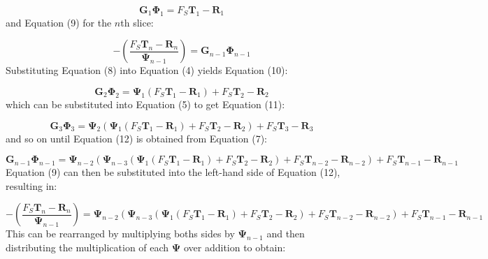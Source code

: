 \documentclass[12pt]{article}
\begin{document}
\begin{displaymath}
{\mathbf{G}}_{1} {\mathbf{Φ}}_{1}={F_{S}} {\mathbf{T}}_{1}-{\mathbf{R}}_{1}
\end{displaymath}
and Equation (9) for the $n$th slice:

\begin{displaymath}
-\left(\frac{{F_{S}} {\mathbf{T}}_{n}-{\mathbf{R}}_{n}}{{\mathbf{Ψ}}_{n-1}}\right)={\mathbf{G}}_{n-1} {\mathbf{Φ}}_{n-1}
\end{displaymath}
Substituting Equation (8) into Equation (4) yields Equation (10):

\begin{displaymath}
{\mathbf{G}}_{2} {\mathbf{Φ}}_{2}={\mathbf{Ψ}}_{1} \left({F_{S}} {\mathbf{T}}_{1}-{\mathbf{R}}_{1}\right)+{F_{S}} {\mathbf{T}}_{2}-{\mathbf{R}}_{2}
\end{displaymath}
which can be substituted into Equation (5) to get Equation (11):

\begin{displaymath}
{\mathbf{G}}_{3} {\mathbf{Φ}}_{3}={\mathbf{Ψ}}_{2} \left({\mathbf{Ψ}}_{1} \left({F_{S}} {\mathbf{T}}_{1}-{\mathbf{R}}_{1}\right)+{F_{S}} {\mathbf{T}}_{2}-{\mathbf{R}}_{2}\right)+{F_{S}} {\mathbf{T}}_{3}-{\mathbf{R}}_{3}
\end{displaymath}
and so on until Equation (12) is obtained from Equation (7):

\begin{displaymath}
{\mathbf{G}}_{n-1} {\mathbf{Φ}}_{n-1}={\mathbf{Ψ}}_{n-2} \left({\mathbf{Ψ}}_{n-3} \left({\mathbf{Ψ}}_{1} \left({F_{S}} {\mathbf{T}}_{1}-{\mathbf{R}}_{1}\right)+{F_{S}} {\mathbf{T}}_{2}-{\mathbf{R}}_{2}\right)+{F_{S}} {\mathbf{T}}_{n-2}-{\mathbf{R}}_{n-2}\right)+{F_{S}} {\mathbf{T}}_{n-1}-{\mathbf{R}}_{n-1}
\end{displaymath}
Equation (9) can then be substituted into the left-hand side of Equation (12), resulting in:

\begin{displaymath}
-\left(\frac{{F_{S}} {\mathbf{T}}_{n}-{\mathbf{R}}_{n}}{{\mathbf{Ψ}}_{n-1}}\right)={\mathbf{Ψ}}_{n-2} \left({\mathbf{Ψ}}_{n-3} \left({\mathbf{Ψ}}_{1} \left({F_{S}} {\mathbf{T}}_{1}-{\mathbf{R}}_{1}\right)+{F_{S}} {\mathbf{T}}_{2}-{\mathbf{R}}_{2}\right)+{F_{S}} {\mathbf{T}}_{n-2}-{\mathbf{R}}_{n-2}\right)+{F_{S}} {\mathbf{T}}_{n-1}-{\mathbf{R}}_{n-1}
\end{displaymath}
This can be rearranged by multiplying boths sides by ${\mathbf{Ψ}}_{n-1}$ and then distributing the multiplication of each $\mathbf{Ψ}$ over addition to obtain:
\end{document}
